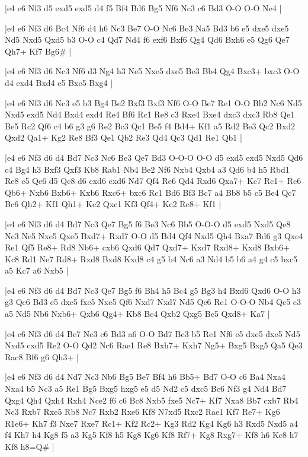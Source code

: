 \whitename{}
\blackname{}
\makegametitle
|e4 e6 Nf3 d5 exd5 exd5 d4 f5 Bf4 Bd6 Bg5 Nf6 Nc3 c6 Bd3 O-O O-O Ne4  |

\whitename{}
\blackname{}
\makegametitle
|e4 e6 Nf3 d6 Bc4 Nf6 d4 h6 Nc3 Be7 O-O Nc6 Be3 Na5 Bd3 b6 e5 dxe5 dxe5 Nd5 Nxd5 Qxd5 b3 O-O c4 Qd7 Nd4 f6 exf6 Bxf6 Qg4 Qd6 Bxh6 e5 Qg6 Qe7 Qh7+ Kf7 Bg6\#  |

\whitename{}
\blackname{}
\makegametitle
|e4 e6 Nf3 d6 Nc3 Nf6 d3 Ng4 h3 Ne5 Nxe5 dxe5 Be3 Bb4 Qg4 Bxc3+ bxc3 O-O d4 exd4 Bxd4 e5 Bxe5 Bxg4  |

\whitename{}
\blackname{}
\makegametitle
|e4 e6 Nf3 d6 Nc3 e5 b3 Bg4 Be2 Bxf3 Bxf3 Nf6 O-O Be7 Re1 O-O Bb2 Nc6 Nd5 Nxd5 exd5 Nd4 Bxd4 exd4 Re4 Bf6 Rc1 Re8 c3 Rxe4 Bxe4 dxc3 dxc3 Rb8 Qe1 Be5 Rc2 Qf6 c4 b6 g3 g6 Re2 Bc3 Qc1 Be5 f4 Bd4+ Kf1 a5 Rd2 Be3 Qc2 Bxd2 Qxd2 Qa1+ Kg2 Re8 Bf3 Qe1 Qb2 Re3 Qd4 Qc3 Qd1 Re1 Qb1  |

\whitename{}
\blackname{}
\makegametitle
|e4 e6 Nf3 d6 d4 Bd7 Nc3 Nc6 Be3 Qe7 Bd3 O-O-O O-O d5 exd5 exd5 Nxd5 Qd6 c4 Bg4 h3 Bxf3 Qxf3 Kb8 Rab1 Nb4 Be2 Nf6 Nxb4 Qxb4 a3 Qd6 b4 h5 Rbd1 Re8 c5 Qe6 d5 Qc8 d6 cxd6 cxd6 Nd7 Qf4 Re6 Qd4 Rxd6 Qxa7+ Kc7 Rc1+ Rc6 Qb6+ Nxb6 Bxb6+ Kxb6 Rxc6+ bxc6 Rc1 Bd6 Bf3 Bc7 a4 Bb8 b5 c5 Be4 Qc7 Bc6 Qh2+ Kf1 Qh1+ Ke2 Qxc1 Kf3 Qf4+ Ke2 Re8+ Kf1  |

\whitename{}
\blackname{}
\makegametitle
|e4 e6 Nf3 d6 d4 Bd7 Nc3 Qe7 Bg5 f6 Be3 Nc6 Bb5 O-O-O d5 exd5 Nxd5 Qe8 Nc3 Ne5 Nxe5 Qxe5 Bxd7+ Rxd7 O-O d5 Bd4 Qf4 Nxd5 Qh4 Bxa7 Bd6 g3 Qxe4 Re1 Qf5 Re8+ Rd8 Nb6+ cxb6 Qxd6 Qd7 Qxd7+ Kxd7 Rxd8+ Kxd8 Bxb6+ Kc8 Rd1 Ne7 Rd8+ Rxd8 Bxd8 Kxd8 c4 g5 b4 Nc6 a3 Nd4 b5 b6 a4 g4 c5 bxc5 a5 Kc7 a6 Nxb5  |

\whitename{}
\blackname{}
\makegametitle
|e4 e6 Nf3 d6 d4 Bd7 Nc3 Qe7 Bg5 f6 Bh4 h5 Bc4 g5 Bg3 h4 Bxd6 Qxd6 O-O h3 g3 Qc6 Bd3 e5 dxe5 fxe5 Nxe5 Qf6 Nxd7 Nxd7 Nd5 Qc6 Re1 O-O-O Nb4 Qc5 c3 a5 Nd5 Nb6 Nxb6+ Qxb6 Qg4+ Kb8 Bc4 Qxb2 Qxg5 Bc5 Qxd8+ Ka7  |

\whitename{}
\blackname{}
\makegametitle
|e4 e6 Nf3 d6 d4 Be7 Nc3 c6 Bd3 a6 O-O Bd7 Be3 b5 Re1 Nf6 e5 dxe5 dxe5 Nd5 Nxd5 cxd5 Re2 O-O Qd2 Nc6 Rae1 Re8 Bxh7+ Kxh7 Ng5+ Bxg5 Bxg5 Qa5 Qe3 Rac8 Bf6 g6 Qh3+  |

\whitename{}
\blackname{}
\makegametitle
|e4 e6 Nf3 d6 d4 Nd7 Nc3 Nb6 Bg5 Be7 Bf4 h6 Bb5+ Bd7 O-O c6 Ba4 Nxa4 Nxa4 b5 Nc3 a5 Re1 Bg5 Bxg5 hxg5 e5 d5 Nd2 c5 dxc5 Bc6 Nf3 g4 Nd4 Bd7 Qxg4 Qh4 Qxh4 Rxh4 Nce2 f6 c6 Bc8 Nxb5 fxe5 Nc7+ Kf7 Nxa8 Bb7 cxb7 Rb4 Nc3 Rxb7 Rxe5 Rb8 Nc7 Rxb2 Rxe6 Kf8 N7xd5 Rxc2 Rae1 Kf7 Re7+ Kg6 R1e6+ Kh7 f3 Nxe7 Rxe7 Rc1+ Kf2 Rc2+ Kg3 Rd2 Kg4 Kg6 h3 Rxd5 Nxd5 a4 f4 Kh7 h4 Kg8 f5 a3 Kg5 Kf8 h5 Kg8 Kg6 Kf8 Rf7+ Kg8 Rxg7+ Kf8 h6 Ke8 h7 Kf8 h8=Q\#  |

